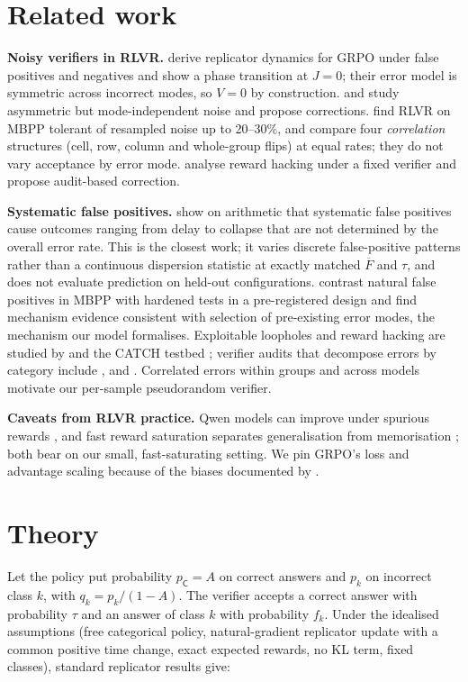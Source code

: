 \documentclass[11pt]{article}
\newcommand{\Fbar}{\overline{F}}
\begin{document}
\section{Related work}\label{sec:related}
\textbf{Noisy verifiers in RLVR.}
\citet{rad2026rate} derive replicator dynamics for GRPO under false positives and negatives and show a phase transition at $J=0$; their error model is symmetric across incorrect modes, so $V=0$ by construction.
\citet{cai2025reinforcement} and \citet{mansouri2025noisecorrected} study asymmetric but mode-independent noise and propose corrections.
\citet{plesner2026an} find RLVR on MBPP tolerant of resampled noise up to 20--30\%, and compare four \emph{correlation} structures (cell, row, column and whole-group flips) at equal rates; they do not vary acceptance by error mode.
\citet{moya2026verifier} analyse reward hacking under a fixed verifier and propose audit-based correction.

\textbf{Systematic false positives.}
\citet{egashira2026delay} show on arithmetic that systematic false positives cause outcomes ranging from delay to collapse that are not determined by the overall error rate. This is the closest work; it varies discrete false-positive patterns rather than a continuous dispersion statistic at exactly matched $\Fbar$ and $\tau$, and does not evaluate prediction on held-out configurations.
\citet{zhang2026when} contrast natural false positives in MBPP with hardened tests in a pre-registered design and find mechanism evidence consistent with selection of pre-existing error modes, the mechanism our model formalises.
Exploitable loopholes and reward hacking are studied by \citet{helff2026llms} and the CATCH testbed \citep{wang2026catch}; verifier audits that decompose errors by category include \citet{xin2026where}, \citet{ray2026before} and \citet{huang2025from}. Correlated errors within groups and across models \citep{xin2026are,kim2025correlated} motivate our per-sample pseudorandom verifier.

\textbf{Caveats from RLVR practice.} Qwen models can improve under spurious rewards \citep{shao2025spurious}, and fast reward saturation separates generalisation from memorisation \citep{rahman2026when}; both bear on our small, fast-saturating setting. We pin GRPO's loss and advantage scaling because of the biases documented by \citet{liu2025understanding}.

\section{Theory}\label{sec:theory}
Let the policy put probability $p_{\mathsf C}=A$ on correct answers and $p_k$ on incorrect class $k$, with $q_k=p_k/(1-A)$.
The verifier accepts a correct answer with probability $\tau$ and an answer of class $k$ with probability $f_k$.
Under the idealised assumptions (free categorical policy, natural-gradient replicator update with a common positive time change, exact expected rewards, no KL term, fixed classes), standard replicator results \citep{hofbauer1998evolutionary} give:
\end{document}
